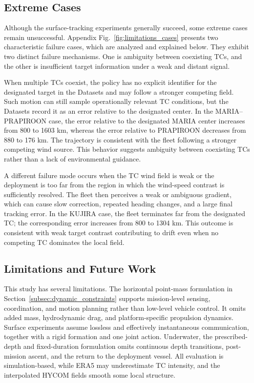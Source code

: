 \documentclass[a4paper,fleqn]{cas-dc}
\begin{document}
\subsection{Extreme Cases}
\label{subsec:extreme_cases}

Although the surface-tracking experiments generally succeed, some extreme
cases remain unsuccessful. Appendix Fig.~\ref{fig:limitations_cases} presents
two characteristic failure cases, which are analyzed and explained below. They
exhibit two distinct failure mechanisms. One is ambiguity between coexisting TCs,
and the other is insufficient target information under a weak and distant
signal.

When multiple TCs coexist, the policy has no explicit identifier for the
designated target in the Datasets and may follow a stronger competing field.
Such motion can still sample operationally relevant TC conditions, but the
Datasets record it as an error relative to the designated center. In the
MARIA--PRAPIROON case, the error relative to the designated MARIA center
increases from 800 to 1603 km, whereas the error relative to PRAPIROON
decreases from 880 to 176 km. The trajectory is consistent with the fleet
following a stronger competing wind source. This behavior suggests ambiguity
between coexisting TCs rather than a lack of environmental guidance.

A different failure mode occurs when the TC wind field is weak or the
deployment is too far from the region in which the wind-speed contrast is
sufficiently resolved. The fleet then perceives a weak or ambiguous gradient,
which can cause slow correction, repeated heading changes, and a large final
tracking error. In the KUJIRA case, the fleet terminates far
from the designated TC; the corresponding error increases from 800 to 1304 km. This
outcome is consistent with weak target contrast contributing to drift even
when no competing TC dominates the local field.

\subsection{Limitations and Future Work}
\label{subsec:limitations_future_work}

This study has several limitations. The horizontal point-mass formulation in
Section~\ref{subsec:dynamic_constraints} supports mission-level sensing,
coordination, and motion planning rather than low-level vehicle control. It
omits added mass, hydrodynamic drag, and platform-specific propulsion
dynamics. Surface experiments assume lossless and effectively instantaneous
communication, together with a rigid formation and one joint action. Underwater,
the prescribed-depth and fixed-duration formulation
omits continuous depth transitions, post-mission ascent, and the return to the
deployment vessel. All evaluation is simulation-based, while ERA5 may
underestimate TC intensity, and the interpolated HYCOM fields smooth some local
structure.
\end{document}
